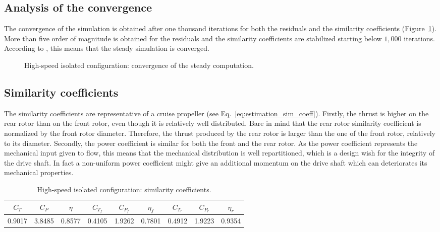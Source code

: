 
\subsection{Analysis of the convergence}
\label{sub:dream_hs_steady_conv}

The convergence of the simulation is obtained 
after one thousand iterations for both
the residuals and the similarity coefficients 
(Figure~\ref{fig:dream_HS_convergence_roe2}). More than
five order of magnitude is obtained for the residuals and
the similarity coefficients are stabilized starting below
$1,000$ iterations. According to \citet{Casey2000},
this means that the steady simulation is converged.
\begin{figure}[htp]
  \centering
  \caption{High-speed isolated configuration: convergence of the steady
  computation.}
  \label{fig:dream_HS_convergence_roe2}
\end{figure}

\subsection{Similarity coefficients}
\label{sub:dream_hs_sim_coeff}

The similarity coefficients are representative of a cruise
propeller (see Eq.~\eqref{eq:estimation_sim_coeff}). 
Firstly, the thrust is higher
on the rear rotor than on the front rotor, even though it is
relatively well distributed. Bare in mind that the rear rotor
similarity coefficient is normalized by the front rotor diameter. Therefore, 
the thrust produced by the rear rotor is larger than the one of the front rotor, 
relatively to its diameter. 
Secondly, the power coefficient is similar for both the front and the
rear rotor. As the power coefficient represents the mechanical input
given to flow, this means that the mechanical distribution is 
well repartitioned, which is a design wish for the integrity of
the drive shaft. In fact a non-uniform power coefficient
might give an additional momentum on the drive shaft which can
deteriorates its mechanical properties.
\begin{table}[htp]
   \centering
  \begin{tabular}{ccc|cccccc}
    \toprule
    $C_T$ & $C_P$ & $\eta$ & $C_{T_f}$ & $C_{P_f}$ & $\eta_f$ & $C_{T_r}$ & $C_{P_r}$ & $\eta_r$ \\
    \midrule
    0.9017 & 3.8485 & 0.8577 & 0.4105 & 1.9262 & 0.7801 & 0.4912 & 1.9223 & 0.9354 \\
    \bottomrule
  \end{tabular}
  \caption{High-speed isolated configuration: similarity coefficients.}
  \label{tab:dream_HS_sim_coeff}
\end{table}

